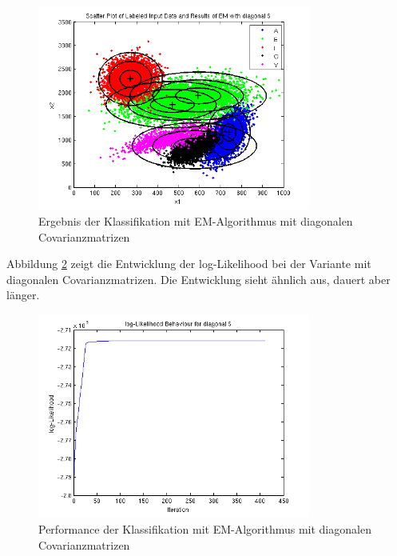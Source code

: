 \begin{figure}[h!]
  \centering
	\includegraphics[width=0.8\textwidth]{./figures/6_1_EM_classification_diag.png}
	\caption{Ergebnis der Klassifikation mit EM-Algorithmus mit diagonalen Covarianzmatrizen}
	\label{fig:6_1_EM_classification_diag}
\end{figure}

Abbildung \ref{fig:6_1_EM_performance_diag} zeigt die Entwicklung der log-Likelihood bei der Variante mit diagonalen Covarianzmatrizen. Die Entwicklung sieht ähnlich aus, dauert aber länger.

\begin{figure}[h!]
  \centering
	\includegraphics[width=0.8\textwidth]{./figures/6_1_EM_perf_diag.png}
	\caption{Performance der Klassifikation mit EM-Algorithmus mit diagonalen Covarianzmatrizen}
	\label{fig:6_1_EM_performance_diag}
\end{figure}
